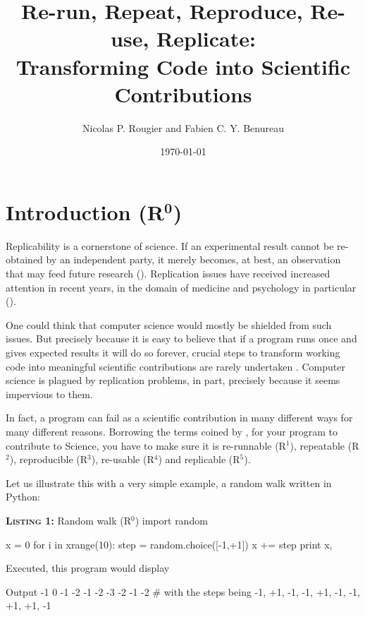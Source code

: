 \documentclass[a4paper,11pt]{article}
\title{Re-run, Repeat, Reproduce, Re-use, Replicate:\\Transforming Code into Scientific Contributions}
\author{Nicolas P. Rougier and Fabien C. Y. Benureau}
\date{\today}
\begin{document}
\maketitle
\section*{Introduction (R$^{\mathbf 0}$)}

Replicability is a cornerstone of science.
If an experimental result cannot be re-obtained by an independent party,
it merely becomes, at best, an observation that
may feed future research (\cite{Mesirov:2010,osc:2015}). 
Replication issues have received increased attention in recent years,
in the domain of medicine and psychology in particular (\cite{Iqbal:2016}).

One could think that computer science would mostly be shielded from such issues.
But precisely because it is easy to believe that
if a program runs once and gives expected results it will do so forever, 
crucial steps to transform working code into meaningful scientific contributions are rarely undertaken \citep{Sandve:2013,Schwab:2000}. 
Computer science is plagued by replication problems,
in part, precisely because it seems impervious to them.

In fact, a program can fail as a scientific contribution
in many different ways for many different reasons.
Borrowing the terms coined by \citeauthor{Goble:2016} \citep{Goble:2016},
for your program to contribute to Science,
you have to make sure it is
re-runnable (R$^1$),
repeatable (R$^2$),
reproducible (R$^3$),
re-usable (R$^4$)
and replicable (R$^5$).

Let us illustrate this with a very simple example,
a random walk written in Python:

\begin{code}{\textbf{\textsc{Listing 1:}} Random walk (R$^0$)}
import random

x = 0
for i in xrange(10):
    step = random.choice([-1,+1])
    x += step
    print x,
\end{code}

Executed, this program would display 
\begin{code}{Output}
-1  0 -1 -2 -1 -2 -3 -2 -1 -2 # with the steps being -1, +1, -1, -1, +1, -1, -1, +1, +1, -1
\end{code}
\end{document}
